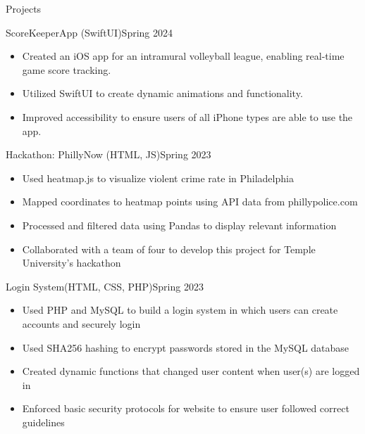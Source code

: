 \documentclass[]{mcdowellcv}
\begin{document}
	\begin{cvsection}{Projects}
		\begin{cvsubsection}{ScoreKeeperApp (SwiftUI)}{}{Spring 2024}
			\begin{itemize}
				\item Created an iOS app for an intramural volleyball league, enabling real-time game score tracking.
				\item Utilized SwiftUI to create dynamic animations and functionality.
				\item Improved accessibility to ensure users of all iPhone types are able to use the app.
			\end{itemize}
		\end{cvsubsection}

		\begin{cvsubsection}{Hackathon: PhillyNow (HTML, JS)}{}{Spring 2023}
			\begin{itemize}
				\item Used heatmap.js to visualize violent crime rate in Philadelphia
				\item Mapped coordinates to heatmap points using API data from phillypolice.com
				\item Processed and filtered data using Pandas to display relevant information
				\item Collaborated with a team of four to develop this project for Temple University's hackathon
			\end{itemize}
		\end{cvsubsection}

		\begin{cvsubsection}{Login System(HTML, CSS, PHP)}{}{Spring 2023}
			\begin{itemize}
				\item Used PHP and MySQL to build a login system in which users can create accounts and securely login
				\item Used SHA256 hashing to encrypt passwords stored in the MySQL database
				\item Created dynamic functions that changed user content when user(s) are logged in
				\item Enforced basic security protocols for website to ensure user followed correct guidelines
			\end{itemize}
		\end{cvsubsection}
	\end{cvsection}


	
\end{document}
